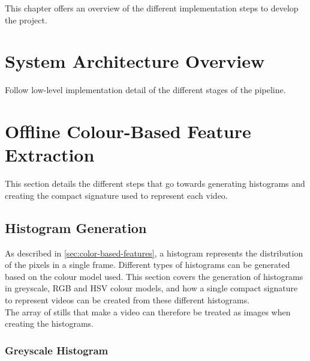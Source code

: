 This chapter offers an overview of the different implementation steps to develop the project.

\section{System Architecture Overview}

Follow low-level implementation detail of the different stages of the pipeline.\\



\section{Offline Colour-Based Feature Extraction}

This section details the different steps that go towards generating histograms and creating the compact signature used to represent each video. 


\subsection{Histogram Generation}

As described in \ref{sec:color-based-features}, a histogram represents the distribution of the pixels in a single frame. Different types of histograms can be generated based on the colour model used. This section covers the generation of histograms in greyscale, RGB and HSV colour models, and how a single compact signature to represent videos can be created from these different histograms.\\

The array of stills that make a video can therefore be treated as images when creating the histograms.


\subsubsection{Greyscale Histogram}

